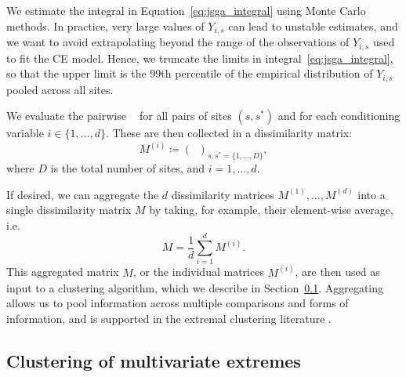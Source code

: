 \documentclass[preprint,12pt,authoryear]{elsarticle}
\newcommand{\eJSGa}[1]{\mathop{\mathrm{eJS}_{i, #1}^{\mathrm{G}_{\lambda}}}\nolimits}
\begin{document}
We estimate the integral in Equation~\eqref{eq:jsga_integral} using Monte Carlo methods. 
In practice, very large values of $Y_{i, s}$ can lead to unstable estimates, and we want to avoid extrapolating beyond the range of the observations of $Y_{i, s}$ used to fit the CE model. 
Hence, we truncate the limits in integral~\eqref{eq:jsga_integral}, so that the upper limit is the 99th percentile of the empirical distribution of $Y_{i, s}$ pooled across all sites. 

We evaluate the pairwise $\eJSGa{s, s^*}$ for all pairs of sites $(s, s^*)$ and for each conditioning variable $i \in \{1, \ldots, d\}$. 
These are then collected in a dissimilarity matrix:
\begin{equation} \label{eq:distance_matrix}
  M^{(i)} \coloneq \left(\eJSGa{s, s^*} \right)_{s, s^* = \{1, \ldots, D\}},
\end{equation}
where $D$ is the total number of sites, and $i = 1, \ldots, d$.

If desired, we can aggregate the $d$ dissimilarity matrices $M^{(1)}, \ldots, M^{(d)}$ into a single dissimilarity matrix $M$ by taking, for example, their element-wise average, i.e. 
\begin{equation} \label{eq:aggregate_matrix}
  M = \frac{1}{d} \sum_{i=1}^d M^{(i)}.
\end{equation}
This aggregated matrix $M$, or the individual matrices $M^{(i)}$, are then used as input to a clustering algorithm, which we describe in Section~\ref{subsec:clustering}.
Aggregating allows us to pool information across multiple comparisons and forms of information, and is supported in the extremal clustering literature \citep{Mornet2017-is}.

\subsection{Clustering of multivariate extremes}
\label{subsec:clustering}
\end{document}
